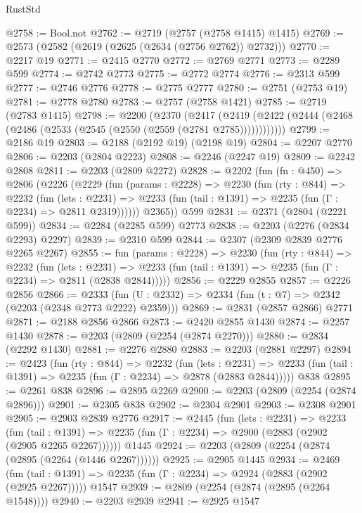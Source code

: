 \begin{lexlean}{RustStd}
\begin{coremodule}
@2758 := Bool.not
@2762 := @2719 (@2757 (@2758 @1415) @1415)
@2769 := @2573 (@2582 (@2619 (@2625 (@2634 (@2756 @2762)) @2732)))
@2770 := @2217 @19
@2771 := @2415 @2770
@2772 := @2769 @2771
@2773 := @2289 @599
@2774 := @2742 @2773
@2775 := @2772 @2774
@2776 := @2313 @599
@2777 := @2746 @2776
@2778 := @2775 @2777
@2780 := @2751 (@2753 @19)
@2781 := @2778 @2780
@2783 := @2757 (@2758 @1421)
@2785 := @2719 (@2783 @1415)
@2798 := @2200
    (@2370
      (@2417 (@2419 (@2422 (@2444 (@2468 (@2486 (@2533 (@2545 (@2550 (@2559 (@2781 @2785))))))))))))
@2799 := @2186 @19
@2803 := @2188 (@2192 @19) (@2198 @19)
@2804 := @2207 @2770
@2806 := @2203 (@2804 @2223)
@2808 := @2246 (@2247 @19)
@2809 := @2242 @2808
@2811 := @2203 (@2809 @2272)
@2828 := @2202
    (fun (fn : @450) =>
    @2806
      (@2226
        (@2229
          (fun (params : @2228) =>
          @2230
            (fun (rty : @844) =>
            @2232
              (fun (lets : @2231) =>
              @2233 (fun (tail : @1391) => @2235 (fun (Γ : @2234) => @2811 @2319))))))
        @2365))
    @599
@2831 := @2371 (@2804 (@2221 @599))
@2834 := @2284 (@2285 @599) @2773
@2838 := @2203 (@2276 (@2834 @2293) @2297)
@2839 := @2310 @599
@2844 := @2307 (@2309 @2839 @2776 @2265 @2267)
@2855 := fun (params : @2228) =>
  @2230
    (fun (rty : @844) =>
    @2232
      (fun (lets : @2231) =>
      @2233 (fun (tail : @1391) => @2235 (fun (Γ : @2234) => @2811 (@2838 @2844)))))
@2856 := @2229 @2855
@2857 := @2226 @2856
@2866 := @2333 (fun (U : @2332) => @2334 (fun (t : @7) => @2342 (@2203 (@2348 @2773 @2222) @2359)))
@2869 := @2831 (@2857 @2866) @2771
@2871 := @2188 @2856 @2866
@2873 := @2420 @2855 @1430
@2874 := @2257 @1430
@2878 := @2203 (@2809 (@2254 (@2874 @2270)))
@2880 := @2834 (@2292 @1430)
@2881 := @2276 @2880
@2883 := @2203 (@2881 @2297)
@2894 := @2423
    (fun (rty : @844) =>
    @2232
      (fun (lets : @2231) =>
      @2233 (fun (tail : @1391) => @2235 (fun (Γ : @2234) => @2878 (@2883 @2844)))))
    @838
@2895 := @2261 @838
@2896 := @2895 @2269
@2900 := @2203 (@2809 (@2254 (@2874 @2896)))
@2901 := @2305 @838
@2902 := @2304 @2901
@2903 := @2308 @2901
@2905 := @2903 @2839 @2776
@2917 := @2445
    (fun (lets : @2231) =>
    @2233
      (fun (tail : @1391) => @2235 (fun (Γ : @2234) => @2900 (@2883 (@2902 (@2905 @2265 @2267))))))
    @1445
@2924 := @2203 (@2809 (@2254 (@2874 (@2895 (@2264 (@1446 @2267))))))
@2925 := @2905 @1445
@2934 := @2469
    (fun (tail : @1391) => @2235 (fun (Γ : @2234) => @2924 (@2883 (@2902 (@2925 @2267)))))
    @1547
@2939 := @2809 (@2254 (@2874 (@2895 (@2264 @1548))))
@2940 := @2203 @2939
@2941 := @2925 @1547

\end{coremodule}
\end{lexlean}
